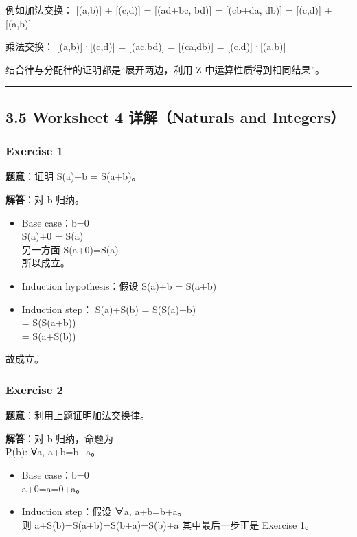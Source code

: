 \documentclass[
  11pt,
]{article}
\begin{document}
例如加法交换： {[}(a,b){]} + {[}(c,d){]} = {[}(ad+bc, bd){]} =
{[}(cb+da, db){]} = {[}(c,d){]} + {[}(a,b){]}

乘法交换： {[}(a,b){]}·{[}(c,d){]} = {[}(ac,bd){]} = {[}(ca,db){]} =
{[}(c,d){]}·{[}(a,b){]}

结合律与分配律的证明都是``展开两边，利用 Z 中运算性质得到相同结果''。

\begin{center}\rule{0.5\linewidth}{0.5pt}\end{center}

\subsection{3.5 Worksheet 4 详解（Naturals and
Integers）}\label{worksheet-4-ux8be6ux89e3naturals-and-integers}

\subsubsection{Exercise 1}\label{exercise-1-1}

\textbf{题意}：证明 S(a)+b = S(a+b)。

\textbf{解答}：对 b 归纳。

\begin{itemize}
\item
  Base case：b=0\\
  S(a)+0 = S(a)\\
  另一方面 S(a+0)=S(a)\\
  所以成立。
\item
  Induction hypothesis：假设 S(a)+b = S(a+b)
\item
  Induction step： S(a)+S(b) = S(S(a)+b)\\
  = S(S(a+b))\\
  = S(a+S(b))
\end{itemize}

故成立。

\subsubsection{Exercise 2}\label{exercise-2-1}

\textbf{题意}：利用上题证明加法交换律。

\textbf{解答}：对 b 归纳，命题为\\
P(b): ∀a, a+b=b+a。

\begin{itemize}
\item
  Base case：b=0\\
  a+0=a=0+a。
\item
  Induction step：假设 ∀a, a+b=b+a。\\
  则 a+S(b)=S(a+b)=S(b+a)=S(b)+a 其中最后一步正是 Exercise 1。
\end{itemize}
\end{document}
